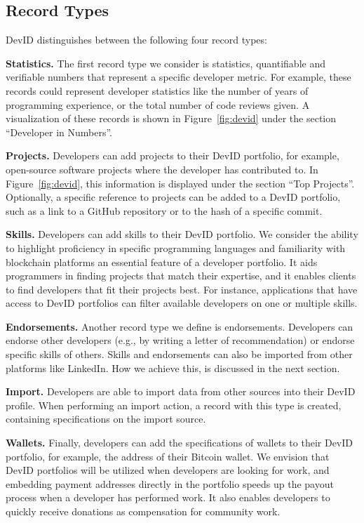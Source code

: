 \subsection{Record Types}
\label{subsec:record_types}
DevID distinguishes between the following four record types:

\textbf{Statistics.}
The first record type we consider is statistics, quantifiable and verifiable numbers that represent a specific developer metric.
For example, these records could represent developer statistics like the number of years of programming experience, or the total number of code reviews given.
A visualization of these records is shown in Figure~\ref{fig:devid} under the section \enquote{Developer in Numbers}.

\textbf{Projects.}
Developers can add projects to their DevID portfolio, for example, open-source software projects where the developer has contributed to.
In Figure~\ref{fig:devid}, this information is displayed under the section \enquote{Top Projects}.
Optionally, a specific reference to projects can be added to a DevID portfolio, such as a link to a GitHub repository or to the hash of a specific commit.

\textbf{Skills.}
Developers can add skills to their DevID portfolio.
We consider the ability to highlight proficiency in specific programming languages and familiarity with blockchain platforms an essential feature of a developer portfolio.
It aids programmers in finding projects that match their expertise, and it enables clients to find developers that fit their projects best.
For instance, applications that have access to DevID portfolios can filter available developers on one or multiple skills.

\textbf{Endorsements.}
Another record type we define is endorsements.
Developers can endorse other developers (e.g., by writing a letter of recommendation) or endorse specific skills of others.
Skills and endorsements can also be imported from other platforms like LinkedIn.
How we achieve this, is discussed in the next section.

\textbf{Import.}
Developers are able to import data from other sources into their DevID profile.
When performing an import action, a record with this type is created, containing specifications on the import source.

\textbf{Wallets.}
Finally, developers can add the specifications of wallets to their DevID portfolio, for example, the address of their Bitcoin wallet.
We envision that DevID portfolios will be utilized when developers are looking for work, and embedding payment addresses directly in the portfolio speeds up the payout process when a developer has performed work.
It also enables developers to quickly receive donations as compensation for community work.


